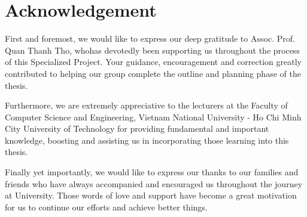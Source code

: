 \section*{\Huge Acknowledgement}
First and foremost, we would like to express our deep gratitude to Assoc. Prof. Quan Thanh Tho, whohas devotedly been supporting us throughout the process of this Specialized Project. Your guidance, encouragement and correction greatly contributed to helping our group complete the outline and planning phase of the thesis.

Furthermore, we are extremely appreciative to the lecturers at the Faculty of Computer Science and Engineering, Vietnam National University - Ho Chi Minh City University of Technology for providing fundamental and important knowledge, boosting and assisting us in incorporating those learning into this
thesis.

Finally yet importantly, we would like to express our thanks to our families and friends who have always accompanied and encouraged us throughout the journey at University. Those words of love and support have become a great motivation for us to continue our efforts and achieve better things.